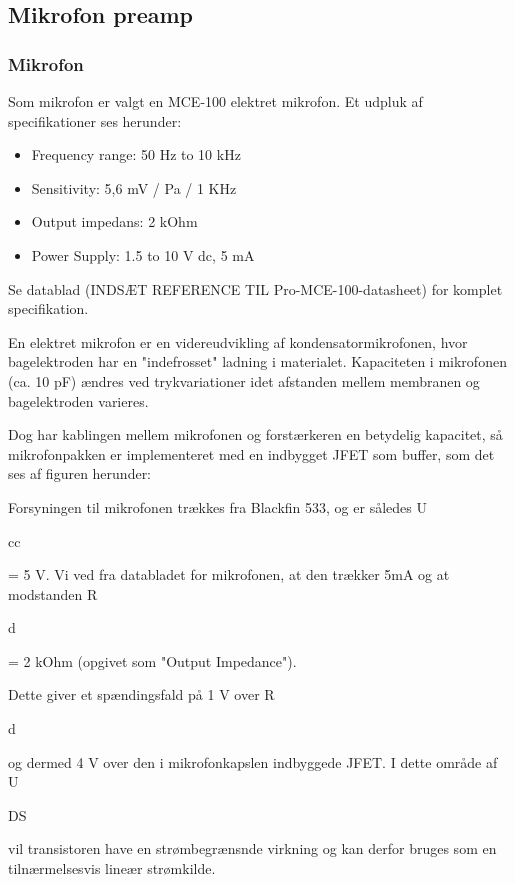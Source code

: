 
\subsection{Mikrofon preamp}

\subsubsection{Mikrofon} 
Som mikrofon er valgt en MCE-100 elektret mikrofon. Et udpluk af specifikationer ses herunder:
\begin{itemize}
	\item Frequency range: 50 Hz to 10 kHz
	\item Sensitivity: 5,6 mV / Pa / 1 KHz
	\item Output impedans: 2 kOhm
	\item Power Supply: 1.5 to 10 V dc, 5 mA
\end{itemize}
Se datablad (INDSÆT REFERENCE TIL Pro-MCE-100-datasheet) for komplet specifikation. 

En elektret mikrofon er en videreudvikling af kondensatormikrofonen, hvor bagelektroden har en "indefrosset" ladning i materialet. Kapaciteten i mikrofonen (ca. 10 pF) ændres ved trykvariationer idet afstanden mellem membranen og bagelektroden varieres. 


Dog har kablingen mellem mikrofonen og forstærkeren en betydelig kapacitet, så mikrofonpakken er implementeret med en indbygget JFET som buffer, som det ses af figuren herunder:

Forsyningen til mikrofonen trækkes fra Blackfin 533, og er således U\begin{tiny}cc\end{tiny} = 5 V. 
Vi ved fra databladet for mikrofonen, at den trækker 5mA og at modstanden R\begin{tiny}d\end{tiny} = 2 kOhm (opgivet som "Output Impedance").

Dette giver et spændingsfald på 1 V over R\begin{tiny}d\end{tiny} og dermed 4 V over den i mikrofonkapslen indbyggede JFET. I dette område af U\begin{tiny}DS\end{tiny} vil transistoren have en strømbegrænsnde virkning og kan derfor bruges som en tilnærmelsesvis lineær strømkilde.

